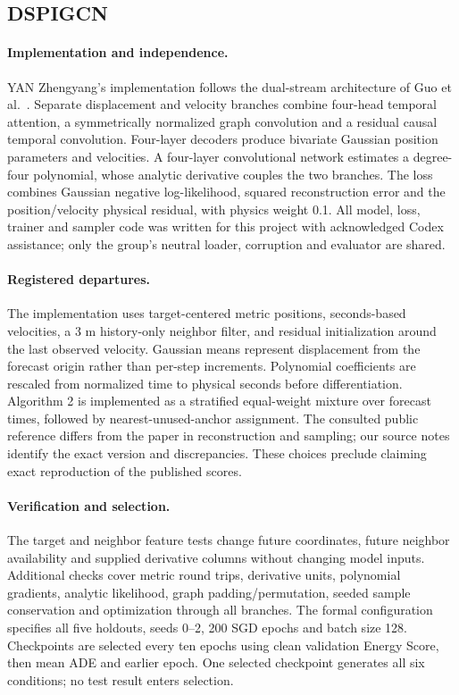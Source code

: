 \subsection{DSPIGCN}
\label{sec:dspigcn}
\paragraph{Implementation and independence.}
YAN Zhengyang's implementation follows the dual-stream architecture of
Guo et al.~\cite{guo2026dspigcn}. Separate displacement and velocity branches
combine four-head temporal attention, a symmetrically normalized graph
convolution and a residual causal temporal convolution. Four-layer decoders
produce bivariate Gaussian position parameters and velocities. A four-layer
convolutional network estimates a degree-four polynomial, whose analytic
derivative couples the two branches. The loss combines Gaussian negative
log-likelihood, squared reconstruction error and the position/velocity
physical residual, with physics weight 0.1. All model, loss, trainer and
sampler code was written for this project with acknowledged Codex assistance;
only the group's neutral loader, corruption and evaluator are shared.

\paragraph{Registered departures.}
The implementation uses target-centered metric positions, seconds-based
velocities, a 3 m history-only neighbor filter, and residual initialization
around the last observed velocity. Gaussian means represent displacement
from the forecast origin rather than per-step increments. Polynomial
coefficients are rescaled from normalized time to physical seconds before
differentiation. Algorithm 2 is implemented as a stratified equal-weight
mixture over forecast times, followed by nearest-unused-anchor assignment.
The consulted public reference differs from the paper in reconstruction and
sampling; our source notes identify the exact version and discrepancies.
These choices preclude claiming exact reproduction of the published scores.

\paragraph{Verification and selection.}
The target and neighbor feature tests change future coordinates, future
neighbor availability and supplied derivative columns without changing model
inputs. Additional checks cover metric round trips, derivative units,
polynomial gradients, analytic likelihood, graph padding/permutation,
seeded sample conservation and optimization through all branches. The formal
configuration specifies all five holdouts, seeds 0--2, 200 SGD epochs and
batch size 128. Checkpoints are selected every ten epochs using clean
validation Energy Score, then mean ADE and earlier epoch. One selected
checkpoint generates all six conditions; no test result enters selection.


